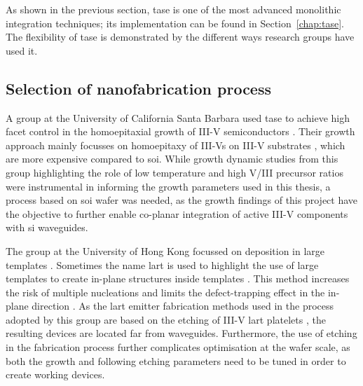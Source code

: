 As shown in the previous section, \acs{tase} is one of the most advanced monolithic integration techniques; its implementation can be found in Section~\ref{chap:tase}. The flexibility of \acs{tase} is demonstrated by the different ways research groups have used it. 

\subsection{Selection of nanofabrication process}

A group at the University of California Santa Barbara used \acs{tase} to achieve high facet control in the homoepitaxial growth of III-V semiconductors \cite{Brunelli2019, Goswami2020, Goswami2021}. Their growth approach mainly focusses on homoepitaxy of III-Vs on III-V substrates \cite{Brunelli2019, Goswami2020, Goswami2021}, which are more expensive compared to \acs{soi}. While growth dynamic studies from this group highlighting the role of low temperature and high V/III precursor ratios were instrumental in informing the growth parameters used in this thesis, a process based on \acs{soi} wafer was needed, as the growth findings of this project have the objective to further enable co-planar integration of active III-V components with \acs{si} waveguides.

The group at the University of Hong Kong focussed on deposition in large templates \cite{Han2020, Yan2021}. Sometimes the name \acf{lart} is used to highlight the use of large templates to create in-plane structures inside templates \cite{Han2020_2}. This method increases the risk of multiple nucleations and limits the defect-trapping effect in the in-plane direction \cite{Han2020, Yan2021, Huang2024}. As the \acs{lart} emitter fabrication methods used in the process adopted by this group are based on the etching of III-V \acs{lart} platelets \cite{Han2020_2, Huang2024}, the resulting devices are located far from waveguides. Furthermore, the use of etching in the fabrication process further complicates optimisation at the wafer scale, as both the growth and following etching parameters need to be tuned in order to create working devices.

